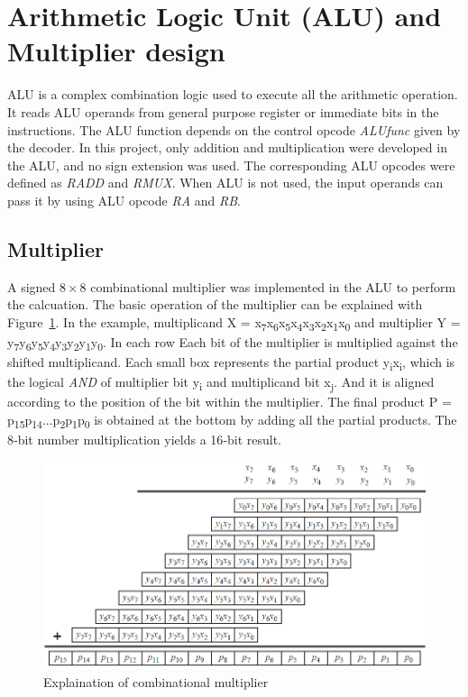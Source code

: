 \section{Arithmetic Logic Unit (ALU) and Multiplier design} \label{Arithmetic Logic UnitALU}

ALU is a complex combination logic used to execute all the arithmetic operation. It reads ALU operands from general purpose register or immediate bits in the instructions. The ALU function depends on the control opcode \textit{ALUfunc} given by the decoder. In this project, only addition and multiplication were developed in the ALU, and no sign extension was used. The corresponding ALU opcodes were defined as \textit{RADD} and \textit{RMUX}. When ALU is not used, the input operands can pass it by using ALU opcode \textit{RA} and \textit{RB}. 

\subsection{Multiplier}

A signed \(8\times8\) combinational multiplier was implemented in the ALU to perform the calcuation. The basic operation of the multiplier can be explained with Figure~\ref {fig:combinational multiplier}. In the example, multiplicand X = x\textsubscript{7}x\textsubscript{6}x\textsubscript{5}x\textsubscript{4}x\textsubscript{3}x\textsubscript{2}x\textsubscript{1}x\textsubscript{0} and multiplier Y = y\textsubscript{7}y\textsubscript{6}y\textsubscript{5}y\textsubscript{4}y\textsubscript{3}y\textsubscript{2}y\textsubscript{1}y\textsubscript{0}. In each row Each bit of the multiplier is multiplied against the shifted multiplicand. Each small box represents the partial product y\textsubscript{i}x\textsubscript{i}, which is the logical \textit{AND} of multiplier bit y\textsubscript{i} and multiplicand bit x\textsubscript{j}. And it is aligned according to the position of the bit within the multiplier. The final product P = p\textsubscript{15}p\textsubscript{14}...p\textsubscript{2}p\textsubscript{1}p\textsubscript{0} is obtained at the bottom by adding all the partial products. The 8‐bit number multiplication yields a 16‐bit result.

\begin{figure}[H]
		\centering
		\includegraphics[width = \textwidth]{Figures/multiplier}		
		\caption{Explaination of combinational multiplier \cite{mux}}
		\label {fig:combinational multiplier}
\end{figure}
\newpage

